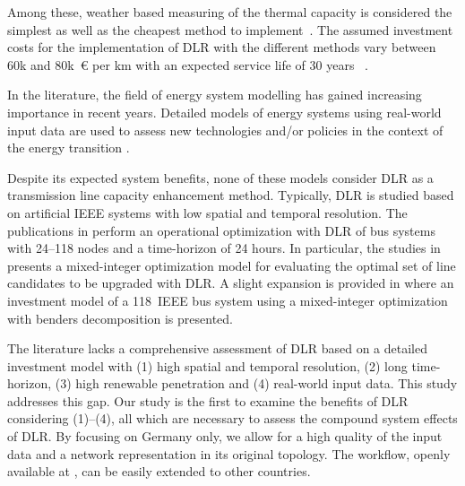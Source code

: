 \documentclass[preprint,12pt]{elsarticle}
\begin{document}
Among these, weather based measuring of the thermal capacity is considered the simplest as well as the cheapest method to implement~\cite{KARIMI2018600}.
The assumed investment costs for the implementation of DLR with the different methods vary between 60k and 80k~\euro{} per km with an expected service life of 30 years ~\cite{samweberProjektMeritOrder2016}.


In the literature, the field of energy system modelling has gained increasing importance in recent years. Detailed models of energy systems using real-world input data are used to assess new technologies and/or policies in the context of the energy transition \cite{gea-bermudezRoleSectorCoupling2021,brownSynergiesSectorCoupling2018,howellsOSeMOSYSOpenSource2011,ogunmodedeOptimizingDesignDispatch2021}.

Despite its expected system benefits, none of these models consider DLR as a transmission line capacity enhancement method. Typically, DLR is studied based on artificial IEEE systems with low spatial and temporal resolution. The publications in \cite{numanCoordinatedOperationReconfigurable2021,viaforaDayaheadDispatchOptimization2019,dabbaghjamaneshEffectiveSchedulingReconfigurable2019,chakrapanimanakariMinimizationWindPower2020,liDayAheadSchedulingPower2019} perform an operational optimization with DLR of bus systems with 24--118 nodes and a time-horizon of 24 hours.
In particular, the studies in \cite{numanCoordinatedOperationReconfigurable2021} presents a mixed-integer optimization model for evaluating the optimal set of line candidates to be upgraded with DLR. A slight expansion is provided in \cite{jabarnejadOptimalInvestmentPlan2016} where an investment model of a 118~IEEE bus system using a mixed-integer optimization with benders decomposition is presented.

The literature lacks a comprehensive assessment of DLR based on a detailed investment model with (1) high spatial and temporal resolution, (2) long time-horizon, (3) high renewable penetration and (4) real-world input data.
This study addresses this gap. Our study is the first to examine the benefits of DLR considering (1)--(4), all which are necessary to assess the compound system effects of DLR.
By focusing on Germany only, we allow for a high quality of the input data and a network representation in its original topology.
The workflow, openly available at \cite{hofmannDynamicLineRating}, can be easily extended to other countries.
\end{document}
